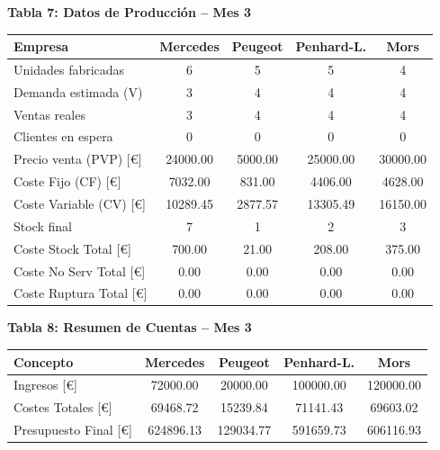\documentclass{standalone}
\begin{document}
	\vspace{4em} %
	
	\begin{minipage}{1.08\linewidth}
		\centering
		
		\textbf{Tabla 7: Datos de Producción – Mes 3}\\[0.5em]
		\begin{tabular}{@{}l
				S[table-format=2.0]
				S[table-format=2.0]
				S[table-format=2.0]
				S[table-format=2.0]@{}}
			\toprule
			\textbf{Empresa} & \textbf{Mercedes} & \textbf{Peugeot} & \textbf{Penhard-L.} & \textbf{Mors} \\
			\midrule
			Unidades fabricadas & 6 & 5 & 5 & 4 \\
			Demanda estimada (V) & 3 & 4 & 4 & 4 \\
			Ventas reales & 3 & 4 & 4 & 4 \\
			Clientes en espera & 0 & 0 & 0 & 0 \\
			Precio venta (PVP) [\euro] & 24000.00 & 5000.00 & 25000.00 & 30000.00 \\
			Coste Fijo (CF) [\euro] & 7032.00 & 831.00 & 4406.00 & 4628.00 \\
			Coste Variable (CV) [\euro] & 10289.45 & 2877.57 & 13305.49 & 16150.00 \\
			Stock final & 7 & 1 & 2 & 3 \\
			Coste Stock Total [\euro] & 700.00 & 21.00 & 208.00 & 375.00 \\
			Coste No Serv Total [\euro] & 0.00 & 0.00 & 0.00 & 0.00 \\
			Coste Ruptura Total [\euro] & 0.00 & 0.00 & 0.00 & 0.00 \\
			\bottomrule
		\end{tabular}
		
		\vspace{2em} %
		
		\textbf{Tabla 8: Resumen de Cuentas – Mes 3}\\[0.5em]
		\begin{tabular}{@{}l
				S[table-format=7.2]
				S[table-format=7.2]
				S[table-format=7.2]
				S[table-format=7.2]@{}}
			\toprule
			\textbf{Concepto} & \textbf{Mercedes} & \textbf{Peugeot} & \textbf{Penhard-L.} & \textbf{Mors} \\
			\midrule
			Ingresos [\euro] & 72000.00 & 20000.00 & 100000.00 & 120000.00 \\
			Costes Totales [\euro] & 69468.72 & 15239.84 & 71141.43 & 69603.02 \\
			Presupuesto Final [\euro] & 624896.13 & 129034.77 & 591659.73 & 606116.93 \\
			\bottomrule
		\end{tabular}
		
	\end{minipage}
	
\end{document}
